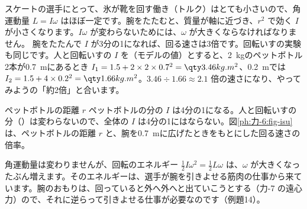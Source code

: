 \label{ph:力-6:hozon}スケートの選手にとって、氷が靴を回す働き（トルク）はとても小さいので、角運動量 $L=I\omega$ はほぼ一定です。腕をたたむと、質量が軸に近づき、$r^2$ で効く $I$ が小さくなります。$I\omega$ が変わらないためには、$\omega$ が大きくならなければなりません。
腕をたたんで $I$ が3分の1になれば、回る速さは3倍です。回転いすの実験も同じです。人と回転いすの $I$ を（モデルの値）とすると、\qty{2}{kg}のペットボトル2本が\qty{0.7}{m}にあるとき $I_1=1.5+2\times2\times0.7^2=\pxgI{3.46}$、\qty{0.2}{m}では $I_2=1.5+4\times0.2^2=\pxgI{1.66}$。$3.46\div1.66\approx2.1$ 倍の速さになり、やってみようの「約2倍」と合います。
\begin{phbaisuru}[半分]{ペットボトルの距離 $r$}
ペットボトルの分の $I$ は4分の1になる。人と回転いすの分（）は変わらないので、全体の $I$ は4分の1にはならない。図\ref{ph:力-6:fig-isu}は、ペットボトルの距離 $r$ と、腕を\qty{0.7}{m}に広げたときをもとにした回る速さの倍率。
\par\vspace{2pt}
\centering
{}
\label{ph:力-6:fig-isu}
\end{phbaisuru}

角運動量は変わりませんが、回転のエネルギー $\tfrac{1}{2}I\omega^2=\tfrac{1}{2}L\omega$ は、$\omega$ が大きくなったぶん増えます。そのエネルギーは、選手が腕を引きよせる筋肉の仕事から来ています。腕のおもりは、回っていると外へ外へと出ていこうとする（力-7 の遠心力）ので、それに逆らって引きよせる仕事が必要なのです（例題14）。


